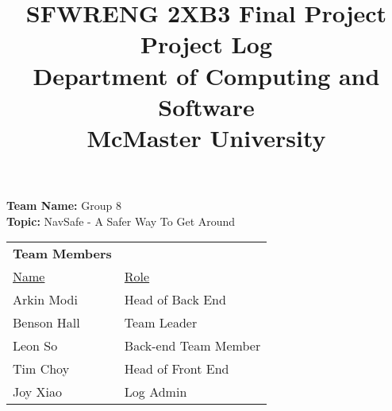 \documentclass[12pt]{article}
\title{SFWRENG 2XB3 Final Project\\
        \large Project Log\\
        \vspace{1ex}
        \large Department of Computing and Software\\
        \large McMaster University}
\date{}
\author{}
\begin{document}
    \maketitle

    \textbf{ Team Name:} Group 8 \\
    \indent \textbf{ Topic:} NavSafe - A Safer Way To Get Around \\

    \begin{tabular}{ll}
        \textbf{Team Members} & ~ \\
        \underline{Name} & \underline{Role} \\
        Arkin Modi  & Head of Back End\\
        Benson Hall & Team Leader \\
        Leon So     & Back-end Team Member\\
        Tim Choy    & Head of Front End \\
        Joy Xiao    & Log Admin \\
    \end{tabular}
    \newline
    \vspace{1cm}
    \newline
    
\end{document}
